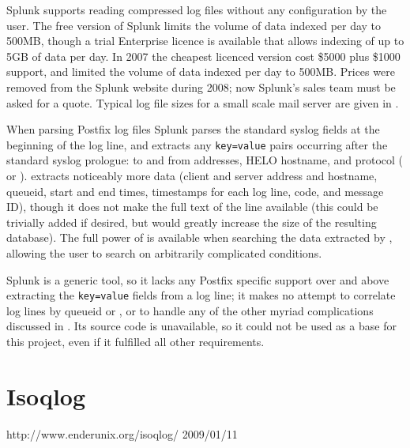 Splunk supports reading compressed log files without any configuration by
the user.  The free version of Splunk limits the volume of data indexed per
day to 500MB, though a trial Enterprise licence is available that allows
indexing of up to 5GB of data per day.  In 2007 the cheapest licenced
version cost \$5000 plus \$1000 support, and limited the volume of data
indexed per day to 500MB\@.  Prices were removed from the Splunk website
during 2008; now Splunk's sales team must be asked for a quote.  Typical
log file sizes for a small scale mail server are given in
.

When parsing Postfix log files Splunk parses the standard
syslog fields at the beginning of the log line, and extracts
any \texttt{key=value} pairs occurring after the standard syslog prologue:
to and from addresses, HELO hostname, and protocol ( or
).  \parsername{} extracts noticeably more data (client and
server  address and hostname, queueid, start and end times,
timestamps for each log line,  code, and message ID), though
it does not make the full text of the line available (this could be
trivially added if desired, but would greatly increase the size of the
resulting database).  The full power of  is available when
searching the data extracted by \parsername{}, allowing the user to search
on arbitrarily complicated conditions.

Splunk is a generic tool, so it lacks any Postfix specific support over and
above extracting the \texttt{key=value} fields from a log line; it makes no
attempt to correlate log lines by queueid or , or to handle
any of the other myriad complications discussed in
.  Its source code is unavailable, so it could
not be used as a base for this project, even if it fulfilled all other
requirements.

\section{Isoqlog}

{http://www.enderunix.org/isoqlog/}
{2009/01/11}

